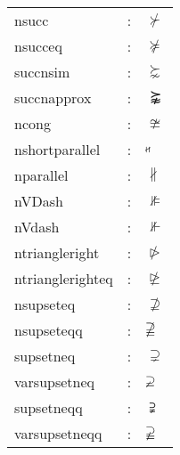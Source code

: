 \documentclass{article}
\begin{document}
\begin{tabular}{lll}
nsucc & : & $\nsucc$\\
nsucceq & : & $\nsucceq$\\
succnsim & : & $\succnsim$\\
succnapprox & : & $\succnapprox$\\
ncong & : & $\ncong$\\
nshortparallel & : & $\nshortparallel$\\
nparallel & : & $\nparallel$\\
nVDash & : & $\nVDash$\\
nVdash & : & $\nVdash$\\
ntriangleright & : & $\ntriangleright$\\
ntrianglerighteq & : & $\ntrianglerighteq$\\
nsupseteq & : & $\nsupseteq$\\
nsupseteqq & : & $\nsupseteqq$\\
supsetneq & : & $\supsetneq$\\
varsupsetneq & : & $\varsupsetneq$\\
supsetneqq & : & $\supsetneqq$\\
varsupsetneqq & : & $\varsupsetneqq$\\
\end{tabular}
\end{document}
